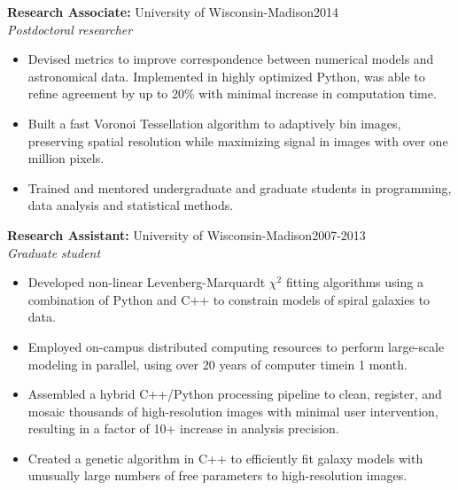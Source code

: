 \documentclass[11pt]{res}
\begin{document}
\begin{resume}
\pagebreak
{\bf Research Associate:} University of Wisconsin-Madison\hfill\mbox{2014}\\
{\it Postdoctoral researcher}
                  \vspace* {0.01 in}\begin{itemize} \itemsep -2pt
                    \item Devised metrics to improve correspondence between numerical models and
                      astronomical data. Implemented in highly
                      optimized Python, was able to refine agreement by
                      up to 20\% with minimal increase in computation time.
                    \item Built a fast Voronoi Tessellation algorithm
                      to adaptively bin images, preserving spatial
                      resolution while maximizing signal in images
                      with over one million pixels.
                    \item Trained and mentored undergraduate and
                      graduate students in programming, data analysis and statistical methods.
                    \end{itemize}

{\bf Research Assistant:} University of Wisconsin-Madison\hfill\mbox{2007-2013}\\
{\it Graduate student}
                  \vspace* {0.01 in}\begin{itemize} \itemsep -2pt
                    \item Developed non-linear Levenberg-Marquardt
                      $\chi^{2}$ fitting algorithms using a
                      combination of Python and C++ to constrain
                      models of spiral galaxies to data. 
                   \item Employed on-campus distributed computing
                     resources to perform large-scale modeling in parallel, using over 20 years of 
                     computer timein 1 month.
                   \item Assembled a hybrid C++/Python processing
                     pipeline to clean, register, and
                     mosaic thousands of high-resolution images with
                     minimal user intervention, resulting in a factor
                     of 10+ increase in analysis precision.
                   \item Created a genetic
                     algorithm in C++ to efficiently fit galaxy models with
                     unusually large numbers of
                     free parameters to high-resolution images.
                  \end{itemize} 


\end{resume}
\end{document}
